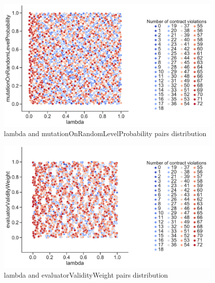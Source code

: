 \begin{figure}
	\centering
	\includegraphics[width=\textwidth]{images/PairsDistr/lambda_mutationOnRandomLevelProbability.pdf}
	\caption[lambda and mutationOnRandomLevelProbability pairs distribution]{lambda and mutationOnRandomLevelProbability pairs distribution}
	\label{fig:lambda_mutationOnRandomLevelProbability_pair}
\end{figure}
\clearpage
\begin{figure}
	\centering
	\includegraphics[width=\textwidth]{images/PairsDistr/lambda_evaluatorValidityWeight.pdf}
	\caption[lambda and evaluatorValidityWeight pairs distribution]{lambda and evaluatorValidityWeight pairs distribution}
	\label{fig:lambda_evaluatorValidityWeight_pair}
\end{figure}
\clearpage
